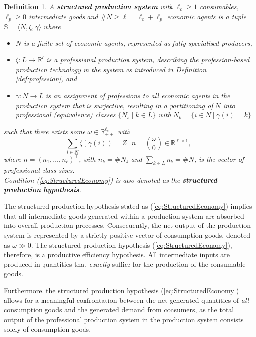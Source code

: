 \documentclass[11pt,fleqn]{article}
\newtheorem{definition}[theorem]{Definition}
\begin{document}
\begin{definition} \label{def:SPS}
	A \textbf{structured production system} with $\ell_c \geqslant 1$ consumables, $\ell_p \geqslant 0$ intermediate goods and $\#N \geqslant \ell = \ell_c + \ell_p$ economic agents is a tuple $\mathbb S = \langle N, \zeta , \gamma \rangle$ where
	\begin{itemize}
		\item $N$ is a finite set of economic agents, represented as fully specialised producers,
		\item $\zeta \colon L \to \mathbb R^{\ell}$ is a professional production system, describing the profession-based production technology in the system as introduced in Definition \ref{def:profession}, and
		\item $\gamma \colon N \to L$ is an assignment of professions to all economic agents in the production system that is surjective, resulting in a partitioning of $N$ into professional (equivalence) classes $\{ N_k \mid k \in L \}$ with $	N_k = \{ i \in N \mid \gamma (i) = k \}$
	\end{itemize}
	such that there exists some $\omega \in \mathbb R^{\ell_c}_{++}$ with
	\begin{equation} \label{eq:StructuredEconomy}
	\sum_{i \in N} \zeta (\gamma (i)) = Z^\top \, n = \binom{\omega}{0} \in \mathbb R^{\ell\times 1}  ,
	\end{equation}
	where $n = (n_1, \ldots , n_\ell )^\top$, with $n_k = \# N_k$ and $\sum_{k\in L} n_k=\#N$, is the vector of professional class sizes. \\
	Condition (\ref{eq:StructuredEconomy}) is also denoted as the \textbf{structured production hypothesis}. 
\end{definition}

\noindent
The structured production hypothesis stated as (\ref{eq:StructuredEconomy}) implies that all intermediate goods generated within a production system are absorbed into overall production processes. Consequently, the net output of the production system is represented by a strictly positive vector of consumption goods, denoted as $\omega \gg 0$. The structured production hypothesis (\ref{eq:StructuredEconomy}), therefore, is a productive efficiency hypothesis. All intermediate inputs are produced in quantities that \emph{exactly} suffice for the production of the consumable goods.

Furthermore, the structured production hypothesis (\ref{eq:StructuredEconomy}) allows for a meaningful confrontation between the net generated quantities of \emph{all} consumption goods and the generated demand from consumers, as the total output of the professional production system in the production system consists solely of consumption goods.  
\end{document}
